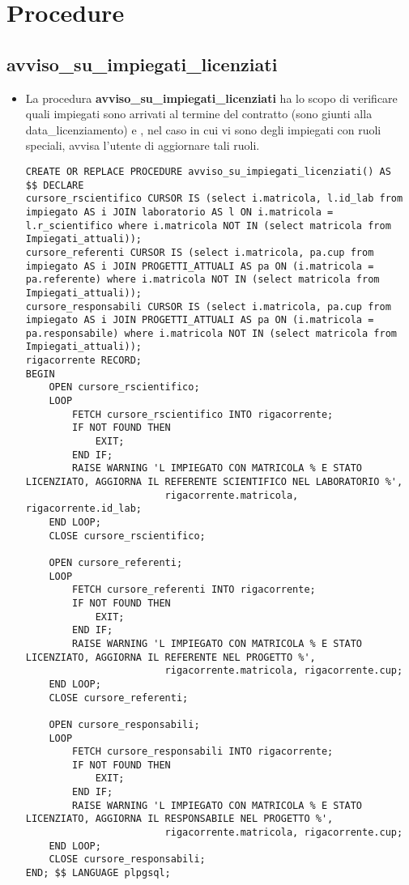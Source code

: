 \section{Procedure}
\subsection{avviso\_su\_impiegati\_licenziati}
\begin{itemize}
\normalsize
\item La procedura \textbf{avviso\_su\_impiegati\_licenziati} ha lo scopo di verificare quali impiegati sono arrivati al termine del contratto (sono giunti alla data\_licenziamento) e , nel caso in cui vi sono degli impiegati con ruoli speciali, avvisa l'utente di aggiornare tali ruoli.

\scriptsize
\begin{lstlisting}
CREATE OR REPLACE PROCEDURE avviso_su_impiegati_licenziati() AS
$$ DECLARE
cursore_rscientifico CURSOR IS (select i.matricola, l.id_lab from impiegato AS i JOIN laboratorio AS l ON i.matricola = l.r_scientifico where i.matricola NOT IN (select matricola from Impiegati_attuali));
cursore_referenti CURSOR IS (select i.matricola, pa.cup from impiegato AS i JOIN PROGETTI_ATTUALI AS pa ON (i.matricola = pa.referente) where i.matricola NOT IN (select matricola from Impiegati_attuali));
cursore_responsabili CURSOR IS (select i.matricola, pa.cup from impiegato AS i JOIN PROGETTI_ATTUALI AS pa ON (i.matricola = pa.responsabile) where i.matricola NOT IN (select matricola from Impiegati_attuali));
rigacorrente RECORD;
BEGIN
	OPEN cursore_rscientifico;
	LOOP
		FETCH cursore_rscientifico INTO rigacorrente;
		IF NOT FOUND THEN
			EXIT;
		END IF;
		RAISE WARNING 'L IMPIEGATO CON MATRICOLA % E STATO LICENZIATO, AGGIORNA IL REFERENTE SCIENTIFICO NEL LABORATORIO %',
						rigacorrente.matricola, rigacorrente.id_lab;
	END LOOP;
	CLOSE cursore_rscientifico;

	OPEN cursore_referenti;
	LOOP
		FETCH cursore_referenti INTO rigacorrente;
		IF NOT FOUND THEN
			EXIT;
		END IF;
		RAISE WARNING 'L IMPIEGATO CON MATRICOLA % E STATO LICENZIATO, AGGIORNA IL REFERENTE NEL PROGETTO %',
						rigacorrente.matricola, rigacorrente.cup;
	END LOOP;
	CLOSE cursore_referenti;

	OPEN cursore_responsabili;
	LOOP
		FETCH cursore_responsabili INTO rigacorrente;
		IF NOT FOUND THEN
			EXIT;
		END IF;
		RAISE WARNING 'L IMPIEGATO CON MATRICOLA % E STATO LICENZIATO, AGGIORNA IL RESPONSABILE NEL PROGETTO %',
						rigacorrente.matricola, rigacorrente.cup;
	END LOOP;
	CLOSE cursore_responsabili;
END; $$ LANGUAGE plpgsql;
\end{lstlisting}
\newpage

\end{itemize}
